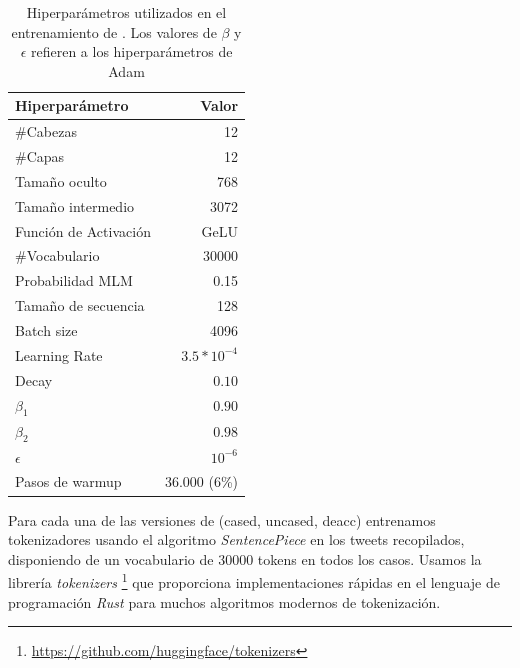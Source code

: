 \begin{table}[t]
    \centering
    \begin{tabular}{l r}
        \hline
        Hiperparámetro    & Valor \\
        \hline
        \#Cabezas         & \num{12}             \\
        \#Capas           & \num{12}             \\
        Tamaño oculto     & \num{768}            \\
        Tamaño intermedio & \num{3072}           \\
        Función de Activación & GeLU           \\
        \#Vocabulario       & \num{30000}         \\
        \hline
        \rule{0pt}{3ex}Probabilidad MLM   & \num{0.15}     \\
        Tamaño de secuencia& 128            \\
        Batch size         & \num{4096}          \\
        Learning Rate      & $3.5 * 10^{-4}$\\
        Decay              & $0.10$          \\
        $\beta_1$          & $0.90$            \\
        $\beta_2$          & $0.98$           \\
        $\epsilon$         & $10^{-6}$      \\
        Pasos de warmup    & \num{36,000} (6\%)   \\
        \hline
    \end{tabular}
    \caption{Hiperparámetros utilizados en el entrenamiento de \robertuito{}. Los valores de $\beta$ y $\epsilon$ refieren a los hiperparámetros de Adam}
    \label{tab:robertuito_architecture}
\end{table}

Para cada una de las versiones de \robertuito{} (cased, uncased, deacc) entrenamos tokenizadores usando el algoritmo \emph{SentencePiece} \cite{kudo-richardson-2018-sentencepiece} en los tweets recopilados, disponiendo de un vocabulario de \num{30000} tokens en todos los casos. Usamos la librería \emph{tokenizers} \footnote{\url{https://github.com/huggingface/tokenizers}} que proporciona implementaciones rápidas en el lenguaje de programación \emph{Rust} para muchos algoritmos modernos de tokenización.


